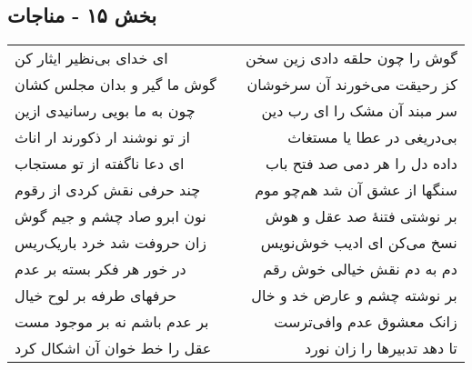 \begin{center}
\section*{بخش ۱۵ - مناجات}
\label{sec:sh015}
\begin{longtable}{l p{0.5cm} r}
ای خدای بی‌نظیر ایثار کن
&&
گوش را چون حلقه دادی زین سخن
\\
گوش ما گیر و بدان مجلس کشان
&&
کز رحیقت می‌خورند آن سرخوشان
\\
چون به ما بویی رسانیدی ازین
&&
سر مبند آن مشک را ای رب دین
\\
از تو نوشند ار ذکورند ار اناث
&&
بی‌دریغی در عطا یا مستغاث
\\
ای دعا ناگفته از تو مستجاب
&&
داده دل را هر دمی صد فتح باب
\\
چند حرفی نقش کردی از رقوم
&&
سنگها از عشق آن شد هم‌چو موم
\\
نون ابرو صاد چشم و جیم گوش
&&
بر نوشتی فتنهٔ صد عقل و هوش
\\
زان حروفت شد خرد باریک‌ریس
&&
نسخ می‌کن ای ادیب خوش‌نویس
\\
در خور هر فکر بسته بر عدم
&&
دم به دم نقش خیالی خوش رقم
\\
حرفهای طرفه بر لوح خیال
&&
بر نوشته چشم و عارض خد و خال
\\
بر عدم باشم نه بر موجود مست
&&
زانک معشوق عدم وافی‌ترست
\\
عقل را خط خوان آن اشکال کرد
&&
تا دهد تدبیرها را زان نورد
\\
\end{longtable}
\end{center}
